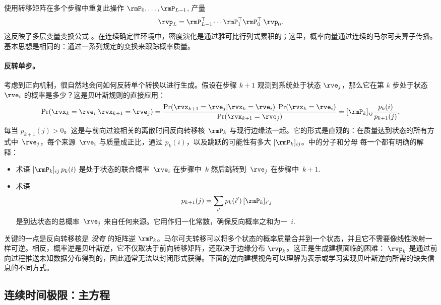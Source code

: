 使用转移矩阵在多个步骤中重复此操作
$\rmP_0, \dots, \rmP_{L-1}$, 产量
\begin{equation*}
\rvp_L = \rmP_{L-1}^\top \cdots \rmP_1^\top \rmP_0^\top\, \rvp_0.
\end{equation*}
这反映了多层变量变换公式
。在连续确定性环境中，密度演化是通过雅可比行列式累积的；这里，概率向量通过连续的马尔可夫算子传播。基本思想是相同的：通过一系列规定的变换来跟踪概率质量。

\paragraph{反转单步。}
考虑到正向机制，很自然地会问如何反转单个转换以进行生成。假设在步骤 $k{+}1$ 观测到系统处于状态 $\rve_j$，那么它在第 $k$ 步处于状态 $\rve_i$ 的概率是多少？这是贝叶斯规则的直接应用：
\begin{align}
\Pr(\rvx_k = \rve_i | \rvx_{k+1} = \rve_j)
= \frac{\Pr(\rvx_{k+1} = \rve_j | \rvx_k = \rve_i)\;\Pr(\rvx_k = \rve_i)}
        {\Pr(\rvx_{k+1} = \rve_j)}
= [\rmP_k]_{ij}\frac{p_k(i)}{p_{k+1}(j)},
\label{eq:discrete-reverse-kernel}
\end{align}
每当 $p_{k+1}(j)>0$。这是与前向过渡相关的离散时间反向转移核~$\rmP_k$ 与现行边缘法一起。它的形式是直观的：在质量达到状态的所有方式中~$\rve_j$，每个来源~$\rve_i$ 与质量成正比，通过 $p_k(i)$，以及跳跃的可能性有多大 $[\rmP_k]_{ij}$。中的分子和分母  每一个都有明确的解释：
\begin{itemize}[leftmargin=2em]
    \item {}
    术语 $[\rmP_k]_{ij}\,p_k(i)$ 是处于状态的联合概率~$\rve_i$ 在步骤中~$k$ 然后跳转到~$\rve_j$ 在步骤中~$k{+}1$.

    \item {}
    术语
    \[
    p_{k+1}(j) = \sum_{i'} p_k(i')\,[\rmP_k]_{i'j}
    \]
    是到达状态的总概率~$\rve_j$ 来自任何来源。它用作归一化常数，确保反向概率之和为一~$i$.
\end{itemize}

关键的一点是反向转移核是 \emph{没有} 的矩阵逆 $\rmP_k$。马尔可夫转移可以将多个状态的概率质量合并到一个状态，并且它不需要像线性映射一样可逆。相反，概率逆是贝叶斯逆，它不仅取决于前向转移矩阵，还取决于边缘分布 $\rvp_k$。这正是生成建模面临的困难： $\rvp_k$ 是通过前向过程推送未知数据分布得到的，因此通常无法以封闭形式获得。下面的逆向建模视角可以理解为表示或学习实现贝叶斯逆向所需的缺失信息的不同方式。

\subsection{连续时间极限：主方程}
\label{subsec:epilogue-ctmc}

